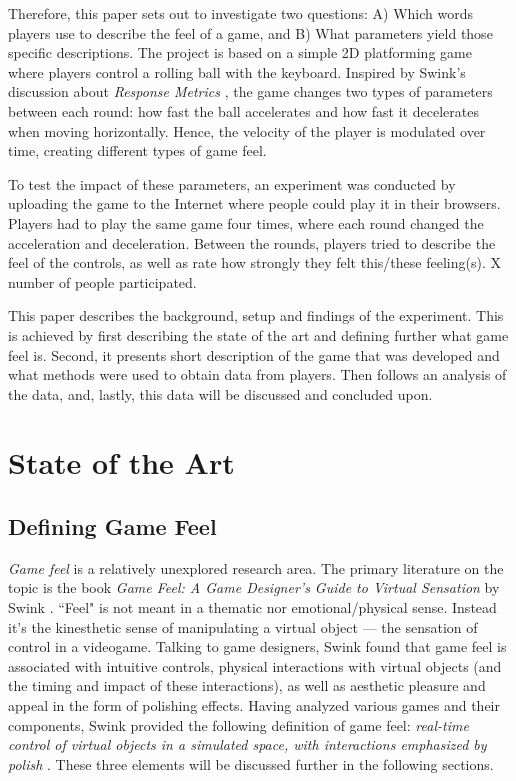 Therefore, this paper sets out to investigate two questions: A) Which words players use to describe the feel of a game, and B) What parameters yield those specific descriptions. The project is based on a simple 2D platforming game where players control a rolling ball with the keyboard. Inspired by Swink's discussion  about \textit{Response Metrics} \cite{swink}, the game changes two types of parameters between each round: how fast the ball accelerates and how fast it decelerates when moving horizontally. Hence, the velocity of the player is modulated over time, creating different types of game feel.


To test the impact of these parameters, an experiment was conducted by uploading the game to the Internet where people could play it in their browsers. Players had to play the same game four times, where each round changed the acceleration and deceleration. Between the rounds, players  tried to describe the feel of the controls, as well as rate how strongly they felt this/these feeling(s). X number of people participated.

This paper describes the background, setup and findings of the experiment. This is achieved by first describing the state of the art and defining further what game feel is. Second, it presents short description of the game that was developed and what methods were used to obtain data from players. Then follows an analysis of the data, and, lastly, this data will be discussed and concluded upon.

\section{State of the Art}
\subsection{Defining Game Feel}
\textit{Game feel} is a relatively unexplored research area. The primary literature on the topic is the book \textit{Game Feel: A Game Designer's Guide to Virtual Sensation} by Swink \cite{swink}. ``Feel" is not meant in a thematic nor emotional/physical sense. Instead it's the kinesthetic sense of manipulating a virtual object --- the sensation of control in a videogame. Talking to game designers, Swink found that game feel is associated with intuitive controls, physical interactions with virtual objects (and the timing and impact of these interactions), as well as aesthetic pleasure and appeal in the form of polishing effects. Having analyzed various games and their components, Swink provided the following definition of game feel: \textit{real-time control of virtual objects in a simulated space, with interactions emphasized by polish} \cite{swink}. These three elements will be discussed further in the following sections.

